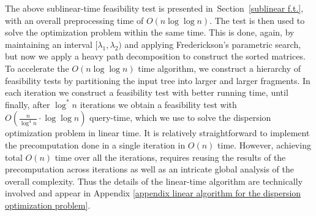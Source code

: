 \documentclass[a4paper,UKenglish]{lipics-v2016}
\theoremstyle{plain}
\begin{document}
The above sublinear-time feasibility test is presented in~Section~\ref{sublinear f.t.}, with an overall preprocessing time of $O(n\log\log n)$.
The test is then used to solve the optimization problem within the same time. This is done, again, by maintaining an interval
$[\lambda_{1},\lambda_{2})$ and applying Frederickson's parametric search, but now we apply a heavy path decomposition to construct
the sorted matrices.
To accelerate the $O(n\log\log n)$ time algorithm, we construct a hierarchy of feasibility tests by partitioning the input tree
into larger and larger fragments. In each iteration we construct a feasibility test with better running time, until finally, after $\log ^*n$ iterations
we obtain a feasibility test with $O(\frac{n}{\log ^4n} \cdot \log \log n)$ query-time, which we use to solve the dispersion optimization problem in linear  time. It is relatively straightforward to implement the precomputation done in a single iteration in $O(n)$ time. However, achieving total $O(n)$ time over all the iterations, requires reusing the results of the precomputation across iterations as well as an intricate global analysis of the overall complexity.
Thus the details of the linear-time algorithm are technically involved and appear in Appendix \ref{appendix linear algorithm for the dispersion optimization problem}.
\end{document}
